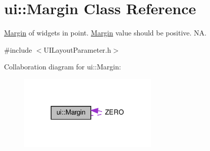 \hypertarget{classui_1_1Margin}{}\section{ui\+:\+:Margin Class Reference}
\label{classui_1_1Margin}


\hyperlink{classui_1_1Margin}{Margin} of widget\textquotesingle{}s in point. \hyperlink{classui_1_1Margin}{Margin} value should be positive.  NA.  




{\ttfamily \#include $<$U\+I\+Layout\+Parameter.\+h$>$}



Collaboration diagram for ui\+:\+:Margin\+:
\nopagebreak
\begin{figure}[H]
\begin{center}
\leavevmode
\includegraphics[width=188pt]{classui_1_1Margin__coll__graph}
\end{center}
\end{figure}
